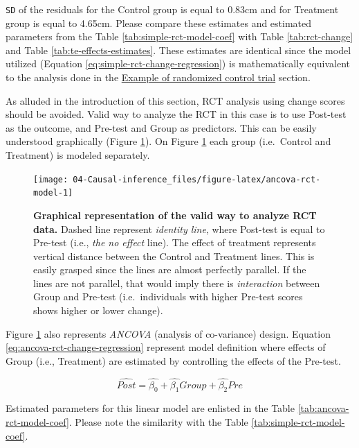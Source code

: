 \documentclass[
]{book}
\begin{document}
\texttt{SD} of the residuals for the Control group is equal to 0.83cm and for Treatment group is equal to 4.65cm. Please compare these estimates and estimated parameters from the Table \ref{tab:simple-rct-model-coef} with Table \ref{tab:rct-change} and Table \ref{tab:te-effects-estimates}. These estimates are identical since the model utilized (Equation \eqref{eq:simple-rct-change-regression}) is mathematically equivalent to the analysis done in the \protect\hyperlink{example-of-randomized-control-trial}{Example of randomized control trial} section.

As alluded in the introduction of this section, RCT analysis using change scores should be avoided. Valid way to analyze the RCT in this case is to use Post-test as the outcome, and Pre-test and Group as predictors. This can be easily understood graphically (Figure \ref{fig:ancova-rct-model}). On Figure \ref{fig:ancova-rct-model} each group (i.e.~Control and Treatment) is modeled separately.

\begin{figure}

{\centering \texttt{[image: 04-Causal-inference\_files/figure-latex/ancova-rct-model-1]} 

}

\caption{\textbf{Graphical representation of the valid way to analyze RCT data.} Dashed line represent \emph{identity line}, where Post-test is equal to Pre-test (i.e., \emph{the no effect} line). The effect of treatment represents vertical distance between the Control and Treatment lines. This is easily grasped since the lines are almost perfectly parallel. If the lines are not parallel, that would imply there is \emph{interaction} between Group and Pre-test (i.e.~individuals with higher Pre-test scores shows higher or lower change).}\label{fig:ancova-rct-model}
\end{figure}



Figure \ref{fig:ancova-rct-model} also represents \emph{ANCOVA} (analysis of co-variance) design. Equation \eqref{eq:ancova-rct-change-regression} represent model definition where effects of Group (i.e., Treatment) are estimated by controlling the effects of the Pre-test.

\begin{equation}
  \widehat{Post} = \hat{\beta_0} + \hat{\beta_1}Group + \hat{\beta_2}Pre
  \label{eq:ancova-rct-change-regression}
\end{equation}

Estimated parameters for this linear model are enlisted in the Table \ref{tab:ancova-rct-model-coef}. Please note the similarity with the Table \ref{tab:simple-rct-model-coef}.
\end{document}
